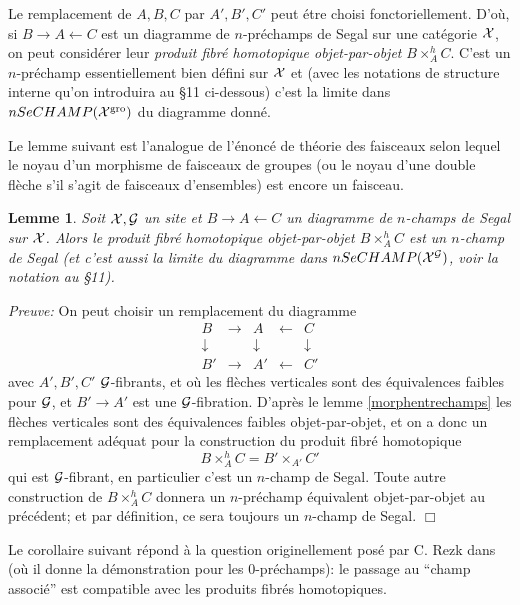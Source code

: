 \documentclass[12pt]{article}
\newcommand{\eop}{\hfill $\Box$\vspace{.1in}}
\newtheorem{lemme}[lemma]{Lemme}
\newcommand{\Gg}{{\cal G}}
\newcommand{\Xx}{{\cal X}}
\begin{document}
Le remplacement de $A,B,C$ par
$A',B',C'$ peut \'etre choisi fonctoriellement. D'o\`u, si $B\rightarrow
A\leftarrow C$ est un diagramme de $n$-pr\'echamps de Segal sur une cat\'egorie
$\Xx$, on peut consid\'erer leur {\em produit fibr\'e homotopique
objet-par-objet}
$B\times ^h_AC$. C'est un $n$-pr\'echamp
essentiellement bien d\'efini sur
$\Xx$ et (avec les notations de structure interne qu'on introduira au \S 11
ci-dessous) c'est la limite dans $nSeCHAMP (\Xx ^{\rm gro})$ du
diagramme
donn\'e.

Le lemme suivant est l'analogue de l'\'enonc\'e de th\'eorie des
faisceaux selon lequel
le noyau d'un morphisme de faisceaux de groupes (ou le noyau d'une double
fl\`eche s'il
s'agit de faisceaux d'ensembles) est encore un faisceau.

\begin{lemme}
\label{fiprodchamp}
Soit $\Xx , \Gg$ un site et $B\rightarrow A\leftarrow C$ un
diagramme de $n$-champs de Segal sur $\Xx$. Alors
le produit fibr\'e homotopique objet-par-objet $B\times ^h_AC$ est un $n$-champ
de Segal (et c'est aussi la limite du diagramme dans $nSeCHAMP(\Xx ^{\Gg})$,
voir la
notation au \S 11).
\end{lemme}
{\em Preuve:}
On peut choisir un remplacement du diagramme
$$
\begin{array}{ccccc}
B&\rightarrow & A & \leftarrow & C \\
\downarrow && \downarrow && \downarrow \\
B'&\rightarrow & A' & \leftarrow & C'
\end{array}
$$
avec $A', B', C'$ $\Gg$-fibrants, et o\`u les fl\`eches verticales sont des
\'equivalences faibles pour $\Gg$, et $B'\rightarrow A'$ est une
$\Gg$-fibration. D'apr\`es le lemme \ref{morphentrechamps} les fl\`eches
verticales sont des \'equivalences faibles  objet-par-objet, et on a
donc un remplacement ad\'equat pour la
construction du produit fibr\'e homotopique
$$
B\times ^h_AC = B'\times _{A'}C'
$$
qui est $\Gg$-fibrant, en particulier c'est un $n$-champ de Segal. Toute
autre construction de $B\times ^h_AC$ donnera un $n$-pr\'echamp
\'equivalent objet-par-objet au pr\'ec\'edent; et par d\'efinition, ce sera
toujours un
$n$-champ de Segal.
\eop

Le corollaire suivant r\'epond \`a la question originellement pos\'e par C. Rezk
dans \cite{Rezk} (o\`u il donne la d\'emonstration pour les
$0$-pr\'echamps): le passage au ``champ associ\'e'' est compatible
avec les produits fibr\'es homotopiques.
\end{document}
